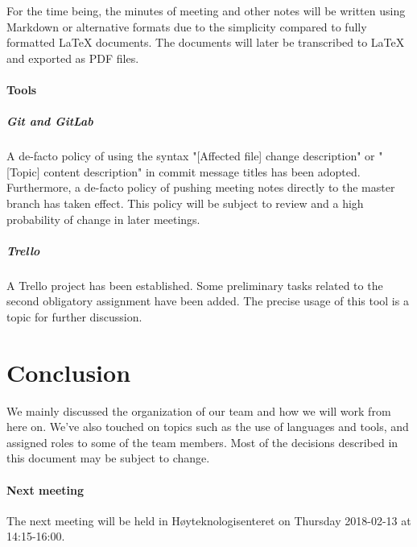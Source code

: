 \documentclass{article}
\begin{document}
For the time being, the minutes of meeting and other notes will be written using Markdown or alternative formats due to the simplicity compared to fully formatted LaTeX documents. The documents will later be transcribed to LaTeX and exported as PDF files.

\paragraph{Tools}

\subparagraph{Git and GitLab}

A de-facto policy of using the syntax "[Affected file] change description" or "[Topic] content description" in commit message titles has been adopted. Furthermore, a de-facto policy of pushing meeting notes directly to the master branch has taken effect. This policy will be subject to review and a high probability of change in later meetings.

\subparagraph{Trello}

A Trello project has been established. Some preliminary tasks related to the second obligatory assignment have been added. The precise usage of this tool is a topic for further discussion.

\section{Conclusion}

We mainly discussed the organization of our team and how we will work from here on. We've also touched on topics such as the use of languages and tools, and assigned roles to some of the team members. Most of the decisions described in this document may be subject to change.

\paragraph{Next meeting}

The next meeting will be held in Høyteknologisenteret on Thursday 2018-02-13 at 14:15-16:00.
\end{document}
